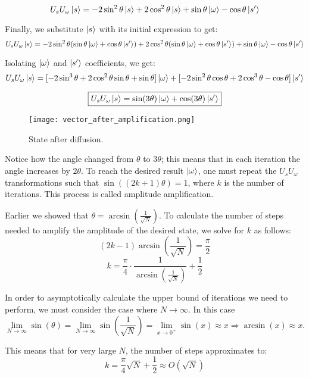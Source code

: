\documentclass[12pt,a4paper]{report}
\begin{document}
\[
U_s U_\omega \ket{s} = -2\sin^2 \theta \ket{s} + 2\cos^2 \theta \ket{s} + \sin \theta \ket{\omega} - \cos \theta \ket{s'}
\]

\noindent
Finally, we substitute \( \ket{s} \) with its initial expression to get:
\[
U_s U_\omega \ket{s} = -2 \sin^2 \theta (\sin \theta \ket{\omega} + \cos \theta \ket{s'}) + 2\cos^2 \theta (\sin \theta \ket{\omega} + \cos \theta \ket{s'}) + \sin \theta \ket{\omega} - \cos \theta \ket{s'}
\]

\noindent
Isolating \( \ket{\omega} \) and \( \ket{s'} \) coefficients, we get:
\[
U_s U_\omega \ket{s} = [-2\sin^3 \theta + 2\cos^2 \theta \sin \theta + \sin \theta] \ket{\omega} + [-2 \sin^2 \theta \cos \theta + 2\cos^3 \theta - \cos \theta] \ket{s'}
\]

\[
\boxed{U_s U_\omega \ket{s} = \sin(3 \theta) \ket{\omega} + \cos(3 \theta) \ket{s'}}
\]

\begin{figure}[!h]
    \centering
    \texttt{[image: vector\_after\_amplification.png]}
    \caption{State after diffusion.}
    \label{fig:grov_adter_diffusion}
\end{figure}

\noindent
Notice how the angle changed from \( \theta \) to \( 3\theta \); this means that in each iteration the angle increases by \( 2\theta \). To reach the desired result \( \ket{\omega} \), one must repeat the \( U_s U_\omega \) transformations such that \( \sin((2k + 1)\theta) = 1\), where \( k \) is the number of iterations. This process is called amplitude amplification.

\newpage

\noindent
Earlier we showed that \( \theta = \arcsin\left(\frac{1}{\sqrt{N}}\right) \). To calculate the number of steps needed to amplify the amplitude of the desired state, we solve for \( k \) as follows:
\[
(2k - 1) \arcsin\left(\frac{1}{\sqrt{N}}\right) = \frac{\pi}{2}
\]
\[
\boxed{k = \frac{\pi}{4} \cdot \frac{1}{\arcsin\left(\frac{1}{\sqrt{N}}\right)} + \frac{1}{2}}
\]

\noindent
In order to asymptotically calculate the upper bound of iterations we need to perform, we must consider the case where \( N \to \infty \). In this case 
\[
\lim_{{N \to \infty}} \sin(\theta) = \lim_{{N \to \infty}} \sin\left(\frac{1}{\sqrt{N}}\right) = \lim_{{x \to 0^+}} \sin(x) \approx x \Rightarrow \arcsin(x) \approx x.
\]

\noindent
This means that for very large \( N \), the number of steps approximates to:
\[
k = \frac{\pi}{4} \sqrt{N} + \frac{1}{2} \approx O(\sqrt{N})
\]
\end{document}
